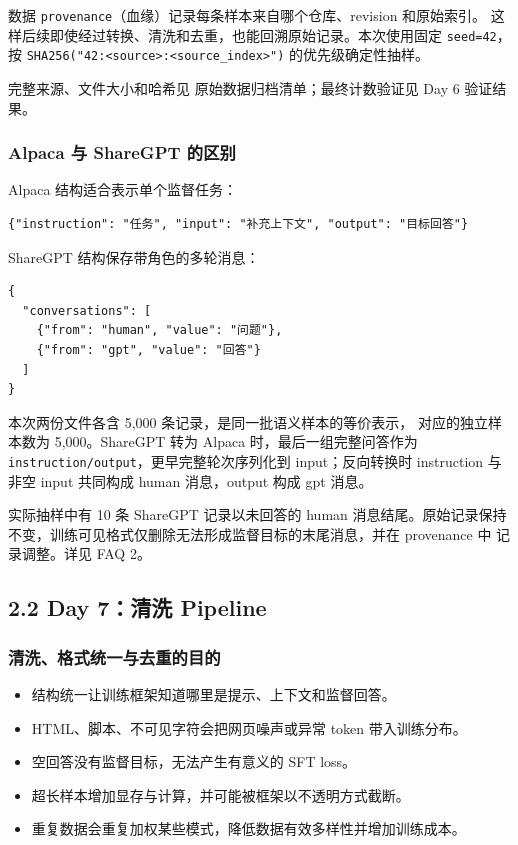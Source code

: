 \documentclass[UTF8,fontset=fandol,a4paper,11pt]{ctexart}
\providecommand{\tightlist}{\setlength{\itemsep}{0pt}\setlength{\parskip}{0pt}}
\begin{document}
数据 \nolinkurl{provenance}（血缘）记录每条样本来自哪个仓库、revision
和原始索引。
这样后续即使经过转换、清洗和去重，也能回溯原始记录。本次使用固定
\nolinkurl{seed=42}，按 \nolinkurl{SHA256("42:<source>:<source_index>")}
的优先级确定性抽样。

完整来源、文件大小和哈希见 原始数据归档清单；最终计数验证见 Day 6
验证结果。

\subsubsection{Alpaca 与 ShareGPT
的区别}\label{alpaca-ux4e0e-sharegpt-ux7684ux533aux522b}

Alpaca 结构适合表示单个监督任务：

\begin{Verbatim}[breaklines,breakanywhere,fontsize=\small]
{"instruction": "任务", "input": "补充上下文", "output": "目标回答"}
\end{Verbatim}

ShareGPT 结构保存带角色的多轮消息：

\begin{Verbatim}[breaklines,breakanywhere,fontsize=\small]
{
  "conversations": [
    {"from": "human", "value": "问题"},
    {"from": "gpt", "value": "回答"}
  ]
}
\end{Verbatim}

本次两份文件各含 5,000 条记录，是同一批语义样本的等价表示，
对应的独立样本数为 5,000。ShareGPT 转为 Alpaca 时，最后一组完整问答作为
{\nolinkurl{instruction/output}，更早完整轮次序列化到} input；反向转换时
instruction 与 非空 input 共同构成 human 消息，output 构成 gpt 消息。

实际抽样中有 10 条 ShareGPT 记录以未回答的 human 消息结尾。原始记录保持
不变，训练可见格式仅删除无法形成监督目标的末尾消息，并在 provenance 中
记录调整。详见 FAQ 2。

\subsection{2.2 Day 7：清洗 Pipeline}\label{day-7ux6e05ux6d17-pipeline}

\subsubsection{清洗、格式统一与去重的目的}\label{ux6e05ux6d17ux683cux5f0fux7edfux4e00ux4e0eux53bbux91cdux7684ux76eeux7684}

\begin{itemize}
\tightlist
\item
  结构统一让训练框架知道哪里是提示、上下文和监督回答。
\item
  HTML、脚本、不可见字符会把网页噪声或异常 token 带入训练分布。
\item
  空回答没有监督目标，无法产生有意义的 SFT loss。
\item
  超长样本增加显存与计算，并可能被框架以不透明方式截断。
\item
  重复数据会重复加权某些模式，降低数据有效多样性并增加训练成本。
\end{itemize}
\end{document}
